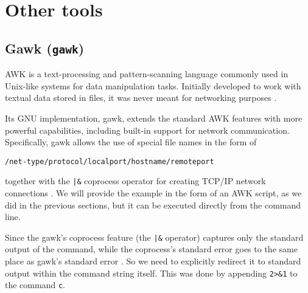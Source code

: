 

\section{Other tools}

\subsection{Gawk (\texttt{gawk})}


AWK is a text-processing and pattern-scanning language commonly used in Unix-like systems for data manipulation tasks. Initially developed to work with textual data stored in files, it was never meant for networking purposes \cite{gawk-doc}.

Its GNU implementation, gawk, extends the standard AWK features with more powerful capabilities, including built-in support for network communication. Specifically, gawk allows the use of special file names in the form of

\qquad \texttt{/net-type/protocol/localport/hostname/remoteport}

together with the \texttt{|\&} coprocess operator for creating TCP/IP network connections \cite{gawk-man}. We will provide the example in the form of an AWK script, as we did in the previous sections, but it can be executed directly from the command line.


Since the gawk's coprocess feature (the \texttt{|\&} operator) captures only the standard output of the command, while the coprocess's standard error goes to the same place as gawk's standard error \cite{gawk-io}. So we need to explicitly redirect it to standard output within the command string itself. This was done by appending \texttt{2>\&1} to the command \texttt{c}.

